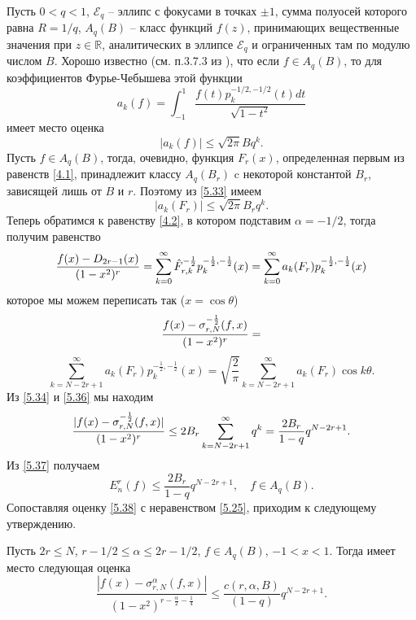 Пусть $0<q<1$, $\mathcal{ E}_q$ -- эллипс с фокусами в точках $\pm1$, сумма полуосей которого равна $R=1/q$, $A_q(B)$ -- класс функций $f(z)$, принимающих вещественные значения при $z\in\mathbb{R}$,  аналитических в эллипсе $\mathcal{ E}_q$ и ограниченных там по модулю числом $B$. Хорошо известно  (см. п.3.7.3 из \cite{Timan}), что если $f\in A_q(B)$, то для коэффициентов Фурье-Чебышева этой функции
\begin{equation}\label{5.32}
 a_k(f)=\int_{-1}^1\frac{f(t)p_k^{-1/2,-1/2}(t)dt}{\sqrt{1-t^2}}
 \end{equation}
имеет место оценка
\begin{equation}\label{5.33}
 |a_k(f)|\le\sqrt{2\pi}Bq^k.
 \end{equation}
Пусть $f\in A_q(B)$, тогда, очевидно, функция $F_r(x)$, определенная первым из равенств \eqref{4.1},  принадлежит классу $A_q(B_r)$ c некоторой константой $B_r$, зависящей лишь от $B$  и $r$. Поэтому из \eqref{5.33}
имеем
\begin{equation}\label{5.34}
 |a_k(F_r)|\le\sqrt{2\pi}B_rq^k.
 \end{equation}
Теперь обратимся к равенству \eqref{4.2}, в котором подставим  $\alpha=-1/2$, тогда получим равенство
 \begin{equation}\label{5.35}
{f(x)-D_{2r-1}(x)\over(1-x^2)^r}=
 \sum_{k=0}^\infty \hat F_{r,k}^{-\frac12} p_{k}^{-\frac12,-\frac12}(x)=
 \sum_{k=0}^\infty a_k(F_r) p_{k}^{-\frac12,-\frac12}(x)
\end{equation}
которое мы можем переписать так ($x=\cos\theta$)
$$
{f(x)-\sigma_{r,N}^{-\frac12}(f,x)\over(1-x^2)^r}=
$$
\begin{equation}\label{5.36}
  \sum_{k=N-2r+1}^\infty a_k(F_r) p_{k}^{-\frac12,-\frac12}(x)=\sqrt{\frac2\pi}
  \sum_{k=N-2r+1}^\infty a_k(F_r) \cos k\theta.
\end{equation}
Из \eqref{5.34} и \eqref{5.36} мы находим
\begin{equation}\label{5.37}
 {|f(x)-\sigma_{r,N}^{-\frac12}(f,x)|\over(1-x^2)^r}\le 2B_r\sum_{k=N-2r+1}^\infty q^k=
 \frac{2B_r}{1-q}q^{N-2r+1}.
  \end{equation}
Из \eqref{5.37} получаем
\begin{equation}\label{5.38}
 E_{n}^r(f)\le \frac{2B_r}{1-q}q^{N-2r+1},\quad f\in A_q(B).
  \end{equation}
Сопоставляя оценку \eqref{5.38} с неравенством \eqref{5.25}, приходим к следующему утверждению.
\begin{corollary} Пусть $2r\le N$, $r-1/2\le \alpha\le 2r-1/2$, $f\in A_q(B)$, $-1<x<1$. Тогда имеет место следующая оценка
\begin{equation}\label{5.39}
 \frac{|f(x)-\sigma_{r,N}^\alpha(f,x)|}
{(1-x^2)^{r-\frac{\alpha}{2}-\frac14}}\le\frac{c(r,\alpha, B)}{(1-q)}q^{N-2r+1}.
 \end{equation}
\end{corollary}



